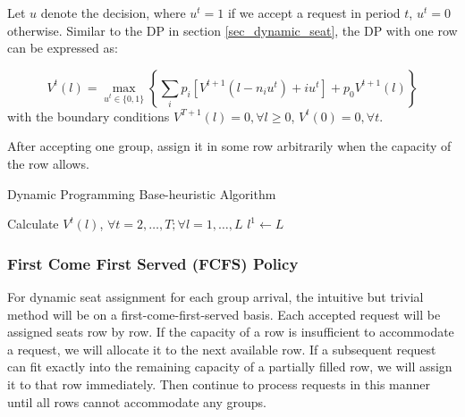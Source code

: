
Let $u$ denote the decision, where $u^{t} = 1$ if we accept a request in period $t$, $u^{t} =0$ otherwise. Similar to the DP in section \ref{sec_dynamic_seat}, the DP with one row can be expressed as:

$$V^{t}(l) =  \max_{u^{t} \in \{0,1\}} \left\{ \sum_{i} p_i [V^{t+1}(l-n_i u^{t})+ i u^{t}] + p_0 V^{t+1}(l)\right\} $$
with the boundary conditions $V^{T+1}(l) =0, \forall l \geq 0$, $V^{t}(0) =0, \forall t$.

After accepting one group, assign it in some row arbitrarily when the capacity of the row allows.

\begin{algorithm}[H]
  \caption{Dynamic Programming Base-heuristic Algorithm}\label{algo_dp_heuris}
  Calculate $V^{t}(l)$, $\forall t =2, \ldots, T; \forall l = 1, \ldots, L$\;
  $l^{1} \gets L$\;
\end{algorithm}

\subsubsection*{First Come First Served (FCFS) Policy}
For dynamic seat assignment for each group arrival, the intuitive but trivial method will be on a first-come-first-served basis. Each accepted request will be assigned seats row by row. If the capacity of a row is insufficient to accommodate a request, we will allocate it to the next available row. If a subsequent request can fit exactly into the remaining capacity of a partially filled row, we will assign it to that row immediately. Then continue to process requests in this manner until all rows cannot accommodate any groups.

